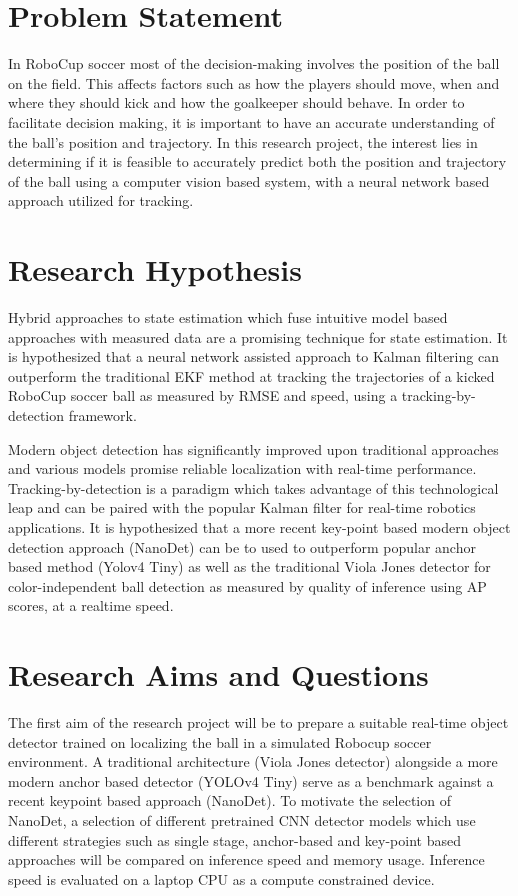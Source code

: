 \documentclass[a4paper,twoside,12pt]{report}
\begin{document}
\section{Problem Statement}

In RoboCup soccer most of the decision-making involves the position of the ball on the field. This affects factors such as how the players should move, when and where they should kick and how the goalkeeper should behave. In order to facilitate decision making, it is important to have an accurate understanding of the ball’s position and trajectory. In this research project, the interest lies in determining if it is feasible to accurately predict both the position and trajectory of the ball using a computer vision based system, with a neural network based approach utilized for tracking.

\section{Research Hypothesis}

Hybrid approaches to state estimation which fuse intuitive model based approaches with measured data are a promising technique for state estimation. It is hypothesized that a neural network assisted approach to Kalman filtering can outperform the traditional EKF method at tracking the trajectories of a kicked RoboCup soccer ball as measured by RMSE and speed, using a tracking-by-detection framework.

Modern object detection has significantly improved upon traditional approaches and various models promise reliable localization with real-time performance. Tracking-by-detection is a paradigm which takes advantage of this technological leap and can be paired with the popular Kalman filter for real-time robotics applications. It is hypothesized that a more recent key-point based modern object detection approach (NanoDet) can be to used to outperform popular anchor based method (Yolov4 Tiny) as well as the traditional Viola Jones detector for color-independent ball detection as measured by quality of inference using AP scores, at a realtime speed. 

\section{Research Aims and Questions}

The first aim of the research project will be to prepare a suitable real-time object detector trained on localizing the ball in a simulated Robocup soccer environment. A traditional architecture (Viola Jones detector) alongside a more modern anchor based detector (YOLOv4 Tiny) serve as a benchmark against a recent keypoint based approach (NanoDet). To motivate the selection of NanoDet, a selection of different pretrained CNN detector models which use different strategies such as single stage, anchor-based and key-point based approaches will be compared on inference speed and memory usage. Inference speed is evaluated on a laptop CPU as a compute constrained device. 
\end{document}
